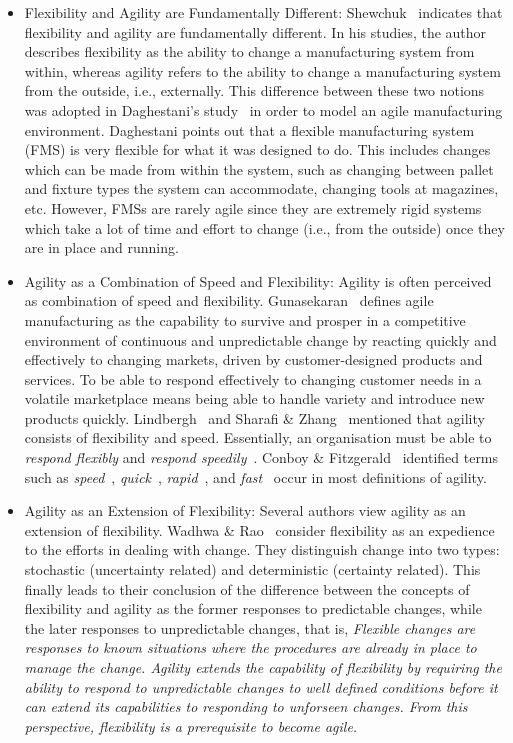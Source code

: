 \begin{itemize}
\item Flexibility and Agility are Fundamentally Different: Shewchuk~\cite{Shewchuk.1998} indicates that flexibility and agility are fundamentally different. In his studies, the author describes flexibility as the ability to change a manufacturing system from within, whereas agility refers to the ability to change a manufacturing system from the outside, i.e., externally. This difference between these two notions was adopted in Daghestani's study~\cite{Daghestani.1998} in order to model an agile manufacturing environment. Daghestani points out that a flexible manufacturing system (FMS) is very flexible for what it was designed to do. This includes changes which can be made from within the system, such as changing between pallet and fixture types the system can accommodate, changing tools at magazines, etc. However, FMSs are rarely agile since they are extremely rigid systems which take a lot of time and effort to change (i.e., from the outside) once they are in place and running.
\item Agility as a Combination of Speed and Flexibility: Agility is often perceived as combination of speed and flexibility. Gunasekaran~\cite{Gunasekaran.1998} defines agile manufacturing as the capability to survive and prosper in a competitive environment of continuous and unpredictable change by reacting quickly and effectively to changing markets, driven by customer-designed products and services. To be able to respond effectively to changing customer needs in a volatile marketplace
means being able to handle variety and introduce new products quickly. Lindbergh~\cite{Lindbergh.1990} and Sharafi \& Zhang~\cite{Sharafi.1999} mentioned that agility consists of flexibility and speed. Essentially, an organisation must be able to \emph{respond flexibly} and \emph{respond speedily}~\cite{Breu.2002}. Conboy \& Fitzgerald~\cite{Conboy.2004} identified terms such as \emph{speed}~\cite{Tan.1998}, \emph{quick}~\cite{DeVor.1995,Kusak.1997,Upton.1994,Yusuf.1999}, \emph{rapid}~\cite{Hong.1996}, and \emph{fast}~\cite{Zain.2003} occur in most definitions of agility.
\item Agility as an Extension of Flexibility: Several authors view agility as an extension of flexibility. Wadhwa \& Rao~\cite{Wadhwa.2003} consider flexibility as an expedience to the efforts in dealing with change. They distinguish change into two types: stochastic (uncertainty related) and deterministic (certainty related). This finally leads to their conclusion of the
difference between the concepts of flexibility and agility as the
former responses to predictable changes, while the later responses
to unpredictable changes, that is, \emph{Flexible changes are responses to known situations where the procedures are already in place to manage the change. Agility extends the capability of flexibility by requiring the ability to respond to unpredictable changes to well defined conditions before it can extend its capabilities to responding to unforseen changes. From this perspective, flexibility is a prerequisite to become agile.}
\end{itemize}


